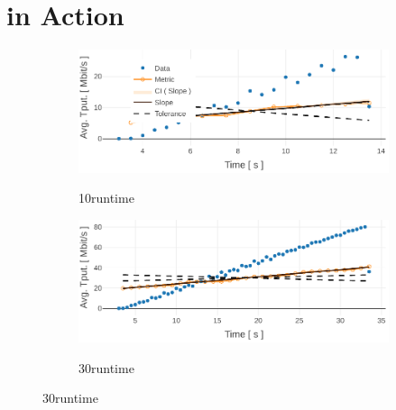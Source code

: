 
\section{\triscale in Action}
\label{sec:triscale_eval}

\begin{figure}
    \centering
    \begin{subfigure}{\linewidth}
        \centering
       	\href{\triscalefig{Figure-4}}{
        \includegraphics[scale=1]{Figures/plot_ledbat_10_runtime.pdf}}
        \caption{10\s runtime}
        \label{fig:10s}
    \end{subfigure}

    \begin{subfigure}[b]{\linewidth}
        \centering
       	\href{\triscalefig{Figure-4}}{
        \includegraphics[scale=1]{Figures/plot_ledbat_30_runtime.pdf}}
        \caption{30\s runtime}
        \label{fig:30s}
    \end{subfigure}


\end{figure}

